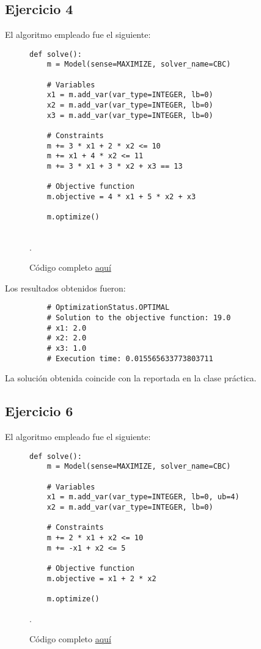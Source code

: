 \documentclass[titlepage, 11pt]{scrartcl}
\begin{document}
	\subsection{Ejercicio 4}
El algoritmo empleado fue el siguiente:
\begin{figure}[H]
	\begin{verbatim}
def solve():
	m = Model(sense=MAXIMIZE, solver_name=CBC)
	
	# Variables
	x1 = m.add_var(var_type=INTEGER, lb=0)
	x2 = m.add_var(var_type=INTEGER, lb=0)
	x3 = m.add_var(var_type=INTEGER, lb=0)
	
	# Constraints
	m += 3 * x1 + 2 * x2 <= 10
	m += x1 + 4 * x2 <= 11
	m += 3 * x1 + 3 * x2 + x3 == 13
	
	# Objective function
	m.objective = 4 * x1 + 5 * x2 + x3
	
	m.optimize()
	
	\end{verbatim}
	\caption{Código completo \href{ex4.py}{aquí}}.
\end{figure}

Los resultados obtenidos fueron:
\begin{figure}[H]
	\begin{verbatim}
	# OptimizationStatus.OPTIMAL
	# Solution to the objective function: 19.0
	# x1: 2.0
	# x2: 2.0
	# x3: 1.0
	# Execution time: 0.015565633773803711
	\end{verbatim}
\end{figure}
La solución obtenida coincide con la reportada en la clase práctica.

\subsection{Ejercicio 6}
El algoritmo empleado fue el siguiente:
\begin{figure}[H]
	\begin{verbatim}
def solve():
	m = Model(sense=MAXIMIZE, solver_name=CBC)
	
	# Variables
	x1 = m.add_var(var_type=INTEGER, lb=0, ub=4)
	x2 = m.add_var(var_type=INTEGER, lb=0)
	
	# Constraints
	m += 2 * x1 + x2 <= 10
	m += -x1 + x2 <= 5
	
	# Objective function
	m.objective = x1 + 2 * x2
	
	m.optimize()
	\end{verbatim}
	\caption{Código completo \href{ex6.py}{aquí}}.
\end{figure}
\end{document}
